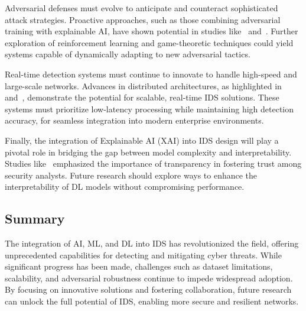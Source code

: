 Adversarial defenses must evolve to anticipate and counteract sophisticated attack strategies. Proactive approaches, such as those combining adversarial training with explainable AI, have shown potential in studies like~\cite{Islam2023} and~\cite{Alotaibi2023AML}. Further exploration of reinforcement learning and game-theoretic techniques could yield systems capable of dynamically adapting to new adversarial tactics.

Real-time detection systems must continue to innovate to handle high-speed and large-scale networks. Advances in distributed architectures, as highlighted in~\cite{Chen2024} and~\cite{Dandaras2023}, demonstrate the potential for scalable, real-time IDS solutions. These systems must prioritize low-latency processing while maintaining high detection accuracy, for seamless integration into modern enterprise environments.

Finally, the integration of Explainable AI (XAI) into IDS design will play a pivotal role in bridging the gap between model complexity and interpretability. Studies like~\cite{Jayalaxmi2022} emphasized the importance of transparency in fostering trust among security analysts. Future research should explore ways to enhance the interpretability of DL models without compromising performance.




\subsection{Summary}
The integration of AI, ML, and DL into IDS has revolutionized the field, offering unprecedented capabilities for detecting and mitigating cyber threats. While significant progress has been made, challenges such as dataset limitations, scalability, and adversarial robustness continue to impede widespread adoption. By focusing on innovative solutions and fostering collaboration, future research can unlock the full potential of IDS, enabling more secure and resilient networks.
